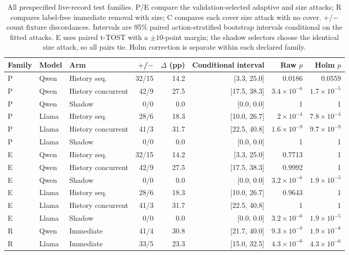\begin{table}[t]\centering\small
\caption{All prespecified live-record test families. P/E compare the validation-selected adaptive and size attacks; R compares label-free immediate removal with size; C compares each cover size attack with no cover. $+$/$-$ count fixture discordances. Intervals are 95\% paired action-stratified bootstrap intervals conditional on the fitted attacks. E uses paired t-TOST with a $\pm10$-point margin; the shadow selectors choose the identical size attack, so all pairs tie. Holm correction is separate within each declared family.}
\label{tab:live-tests}
\setlength{\tabcolsep}{4pt}
\begin{tabularx}{\textwidth}{@{}llYrrrrr@{}}\toprule
Family & Model & Arm & $+$/$-$ & $\Delta$ (pp) & Conditional interval & Raw $p$ & Holm $p$\\\midrule
P & Qwen & History seq. & 32/15 & 14.2 & [3.3, 25.0] & 0.0186 & 0.0559 \\
P & Qwen & History concurrent & 42/9 & 27.5 & [17.5, 38.3] & $3.4\times10^{-6}$ & $1.7\times10^{-5}$ \\
P & Qwen & Shadow & 0/0 & 0.0 & [0.0, 0.0] & 1 & 1 \\
P & Llama & History seq. & 28/6 & 18.3 & [10.0, 26.7] & $2\times10^{-4}$ & $7.8\times10^{-4}$ \\
P & Llama & History concurrent & 41/3 & 31.7 & [22.5, 40.8] & $1.6\times10^{-9}$ & $9.7\times10^{-9}$ \\
P & Llama & Shadow & 0/0 & 0.0 & [0.0, 0.0] & 1 & 1 \\
\midrule
E & Qwen & History seq. & 32/15 & 14.2 & [3.3, 25.0] & 0.7713 & 1 \\
E & Qwen & History concurrent & 42/9 & 27.5 & [17.5, 38.3] & 0.9992 & 1 \\
E & Qwen & Shadow & 0/0 & 0.0 & [0.0, 0.0] & $3.2\times10^{-6}$ & $1.9\times10^{-5}$ \\
E & Llama & History seq. & 28/6 & 18.3 & [10.0, 26.7] & 0.9643 & 1 \\
E & Llama & History concurrent & 41/3 & 31.7 & [22.5, 40.8] & 1 & 1 \\
E & Llama & Shadow & 0/0 & 0.0 & [0.0, 0.0] & $3.2\times10^{-6}$ & $1.9\times10^{-5}$ \\
\midrule
R & Qwen & Immediate & 41/4 & 30.8 & [21.7, 40.0] & $9.3\times10^{-9}$ & $1.9\times10^{-8}$ \\
R & Llama & Immediate & 33/5 & 23.3 & [15.0, 32.5] & $4.3\times10^{-6}$ & $4.3\times10^{-6}$ \\

\end{tabularx}
\end{table}
